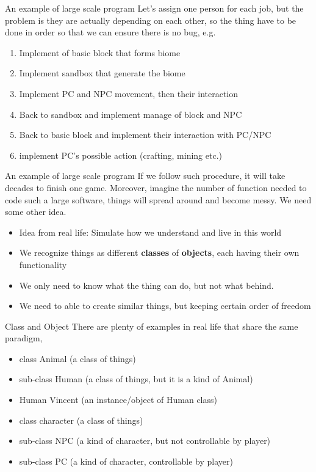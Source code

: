 \documentclass[10pt,xcolor={table,dvipsnames},t]{beamer}
\begin{document}
\begin{frame}{An example of large scale program}
  Let's assign one person for each job, but the problem is they are actually depending on each other, so the thing have to be done in order so that we can ensure there is no bug, e.g.
  \begin{enumerate}
    \item Implement of basic block that forms biome
    \item Implement sandbox that generate the biome
    \item Implement PC and NPC movement, then their interaction
    \item Back to sandbox and implement manage of block and NPC
    \item Back to basic block and implement their interaction with PC/NPC
    \item implement PC's possible action (crafting, mining etc.)
  \end{enumerate}
\end{frame}

\begin{frame}{An example of large scale program}
  If we follow such procedure, it will take decades to finish one game. Moreover, imagine the number of function needed to code such a large software, things will spread around and become messy. We need some other idea.
  \begin{itemize}
    \item Idea from real life: Simulate how we understand and live in this world
    \item We recognize things as different \textbf{classes} of \textbf{objects}, each having their own functionality
    \item We only need to know what the thing can do, but not what behind.
    \item We need to able to create similar things, but keeping certain order of freedom
  \end{itemize}
\end{frame}

\begin{frame}{Class and Object}
  There are plenty of examples in real life that share the same paradigm,
  \begin{itemize}
    \item class Animal (a class of things)
    \item sub-class Human (a class of things, but it is a kind of Animal)
    \item Human Vincent (an instance/object of Human class)
    \item class character (a class of things)
    \item sub-class NPC (a kind of character, but not controllable by player)
    \item sub-class PC (a kind of character, controllable by player)
  \end{itemize}
\end{frame}
\end{document}
